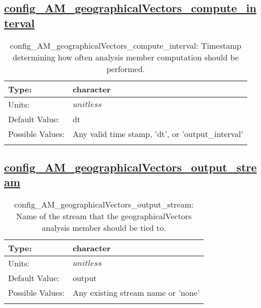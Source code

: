 \subsection[config\_AM\_geographicalVectors\_compute\_interval]{\hyperref[sec:nm_tab_AM_geographicalVectors]{config\_AM\_geographicalVectors\_compute\_interval}}
\label{subsec:nm_sec_config_AM_geographicalVectors_compute_interval}
\begin{center}
\begin{longtable}{| p{2.0in} || p{4.0in} |}
    \hline
    Type: & character \\
    \hline
    Units: & $unitless$ \\
    \hline
    Default Value: & dt \\
    \hline
    Possible Values: & Any valid time stamp, 'dt', or 'output\_interval' \\
    \hline
    \caption{config\_AM\_geographicalVectors\_compute\_interval: Timestamp determining how often analysis member computation should be performed.}
\end{longtable}
\end{center}
\subsection[config\_AM\_geographicalVectors\_output\_stream]{\hyperref[sec:nm_tab_AM_geographicalVectors]{config\_AM\_geographicalVectors\_output\_stream}}
\label{subsec:nm_sec_config_AM_geographicalVectors_output_stream}
\begin{center}
\begin{longtable}{| p{2.0in} || p{4.0in} |}
    \hline
    Type: & character \\
    \hline
    Units: & $unitless$ \\
    \hline
    Default Value: & output \\
    \hline
    Possible Values: & Any existing stream name or 'none' \\
    \hline
    \caption{config\_AM\_geographicalVectors\_output\_stream: Name of the stream that the geographicalVectors analysis member should be tied to.}
\end{longtable}
\end{center}
